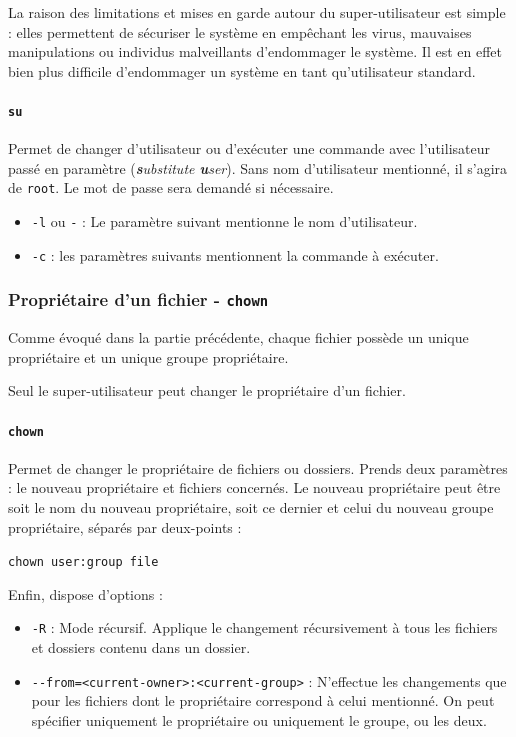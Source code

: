 La raison des limitations et mises en garde autour du super-utilisateur est simple : elles permettent de sécuriser le système en empêchant les virus, mauvaises manipulations ou individus malveillants d'endommager le système. Il est en effet bien plus difficile d'endommager un système en tant qu'utilisateur standard.

\paragraph{\texttt{su}} 
Permet de changer d'utilisateur ou d'exécuter une commande avec l'utilisateur passé en paramètre (\textit{\textbf{s}ubstitute \textbf{u}ser}). Sans nom d'utilisateur mentionné, il s'agira de \texttt{root}. Le mot de passe sera demandé si nécessaire.
\begin{itemize}
    \item \texttt{-l} ou \texttt{-} : Le paramètre suivant mentionne le nom d'utilisateur.
    \item \texttt{-c} : les paramètres suivants mentionnent la commande à exécuter.
\end{itemize}\vspace{\baselineskip}


\subsubsection{Propriétaire d'un fichier - \texttt{chown}}

Comme évoqué dans la partie précédente, chaque fichier possède un unique propriétaire et un unique groupe propriétaire.

Seul le super-utilisateur peut changer le propriétaire d'un fichier.

\paragraph{\texttt{chown}}  
Permet de changer le propriétaire de fichiers ou dossiers. Prends deux paramètres : le nouveau propriétaire et fichiers concernés.
Le nouveau propriétaire peut être soit le nom du nouveau propriétaire, soit ce dernier et celui du nouveau groupe propriétaire, séparés par deux-points : 
\begin{nscenter}
    \texttt{chown user:group file}
\end{nscenter}

Enfin,  dispose d'options : 
\begin{itemize}
    \item \texttt{-R} : Mode récursif. Applique le changement récursivement à tous les fichiers et dossiers contenu dans un dossier.
    \item \texttt{-{}-from=<current-owner>:<current-group>} : N'effectue les changements que pour les fichiers dont le propriétaire correspond à celui mentionné. On peut spécifier uniquement le propriétaire ou uniquement le groupe, ou les deux.
\end{itemize}\vspace{\baselineskip}


